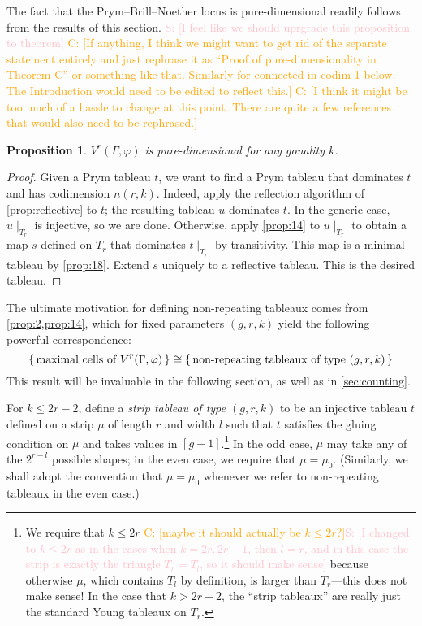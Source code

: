 \documentclass[11pt,reqno]{amsart}
\newcommand*{\restrict}[1]{{\mid}_{#1}}
\newcommand{\caelan}[1]{\textcolor{orange}{\sf C: [#1]}}
\newcommand{\steven}[1]{\textcolor{pink}{\sf S: [#1]}}
\theoremstyle{definition}
\theoremstyle{problem}
\theoremstyle{plain}
\newtheorem{proposition}[definition]{Proposition}
\theoremstyle{remark}
\theoremstyle{theorem}
\numberwithin{equation}{section}
\numberwithin{figure}{section}
\begin{document}
The fact that the Prym--Brill--Noether locus is pure-dimensional
readily follows from the results of this section.  \steven{I feel like
  we should uprgrade this proposition to theorem} \caelan{If anything,
  I think we might want to get rid of the separate statement entirely
  and just rephrase it as ``Proof of pure-dimensionality in Theorem
  C'' or something like that.  Similarly for connected in codim 1
  below.  The Introduction would need to be edited to reflect this.}
\caelan{I think it might be too much of a hassle to change at this
  point.  There are quite a few references that would also need to be
  rephrased.}
\begin{proposition}\label{thm:pure-dim}
	$V^r(\Gamma,\varphi)$ is pure-dimensional for any gonality $k$.
\end{proposition}

\begin{proof}
  Given a Prym tableau $t$, we want to find a Prym tableau that
  dominates $t$ and has codimension $n(r,k)$.  Indeed, apply the
  reflection algorithm of \cref{prop:reflective} to $t$; the resulting
  tableau $u$ dominates $t$.  In the generic case, $u\restrict{T_r}$
  is injective, so we are done.  Otherwise, apply \cref{prop:14} to
  $u\restrict{T_r}$ to obtain a map $s$ defined on $T_r$ that
  dominates $t\restrict{T_r}$ by transitivity.  This map is a minimal
  tableau by \cref{prop:18}.  Extend $s$ uniquely to a reflective
  tableau.  This is the desired tableau.
\end{proof}

The ultimate motivation
for defining non-repeating tableaux comes from \cref{prop:2,prop:14},
which for fixed parameters $(g,r,k)$ yield the following powerful
correspondence:
\begin{equation}
\label{eq:5}
\set{\text{maximal cells of
    $V^r(\Gamma,\varphi)$}} \cong \set{\text{non-repeating tableaux of type $(g,r,k)$}}
\end{equation}
This result will be invaluable in the following section, as well as in
\cref{sec:counting}.

For $k \leq 2r - 2$, define a \textit{strip tableau of type $(g,r,k)$}
to be an injective tableau $t$ defined on a strip $\mu$ of length $r$
and width $l$ such that $t$ satisfies the gluing condition on $\mu$
and takes values in $[g-1]$.\footnote{We require that $k \leq 2r$
  \caelan{maybe it should actually be $k \leq 2r$?}\steven{I changed to $k\leq 2r$ as in the cases when $k=2r, 2r-1$, then $l=r$, and in this case the strip is exactly the triangle $T_r=T_l$, so it should make sense} because otherwise
  $\mu$, which contains $T_l$ by definition, is larger than
  $T_r$---this does not make sense!  In the case that $k > 2r - 2$,
  the ``strip tableaux'' are really just the standard Young tableaux
  on $T_r$.}  In the odd case, $\mu$ may take any of the $2^{r-l}$
possible shapes; in the even case, we require that $\mu = \mu_0$.
(Similarly, we shall adopt the convention that $\mu = \mu_0$ whenever
we refer to non-repeating tableaux in the even case.)
\end{document}
